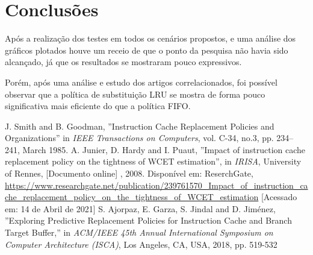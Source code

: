 \documentclass[conference]{IEEEtran}
\begin{document}
\section{Conclusões}


Após a realização dos testes em todos os cenários propostos, e uma análise dos gráficos plotados houve um 
receio de que o ponto da pesquisa não havia sido alcançado, já que os resultados se mostraram pouco expressivos.

Porém, após uma análise e estudo dos artigos correlacionados, foi possível observar que a política de substituição 
LRU se mostra de forma pouco significativa mais eficiente do que a política FIFO. 

\begin{thebibliography}{00}
 J. Smith and B. Goodman, ''Instruction Cache Replacement Policies and Organizations'' in \emph{IEEE Transactions on Computers}, vol. C-34, no.3, pp. 234--241, March 1985.
 A. Junier, D. Hardy and I. Puaut, ''Impact of instruction cache replacement policy on the tightness of WCET estimation'', in \emph{IRISA}, University of Rennes, [Documento online] , 2008. Disponível em: ReserchGate, \url{https://www.researchgate.net/publication/239761570_Impact_of_instruction_cache_replacement_policy_on_the_tightness_of_WCET_estimation} [Acessado em: 14 de Abril de 2021] 
 S. Ajorpaz, E. Garza, S. Jindal and D. Jiménez, ''Exploring Predictive Replacement Policies for Instruction Cache and Branch Target Buffer,'' in \emph{ACM/IEEE 45th Annual International Symposium on Computer Architecture (ISCA)}, Los Angeles, CA, USA, 2018, pp. 519-532
\end{thebibliography}
\end{document}
